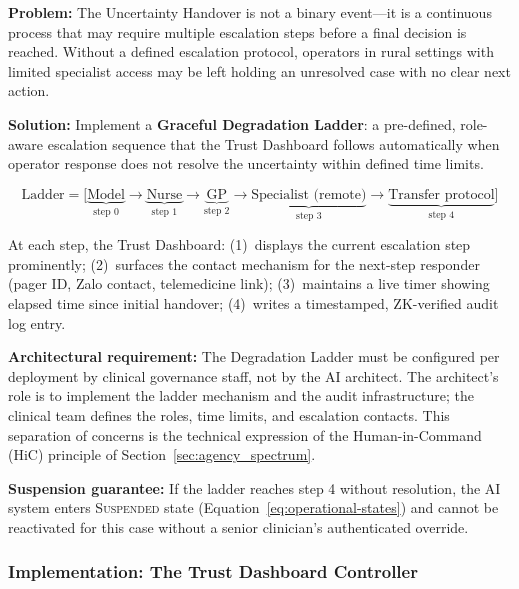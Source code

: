 \begin{tcolorbox}[patternbox,
  title={Design Pattern 5 --- The Graceful Degradation Ladder}]
\textbf{Problem:} The Uncertainty Handover is not a binary
event---it is a continuous process that may require multiple
escalation steps before a final decision is reached.
Without a defined escalation protocol, operators in rural
settings with limited specialist access may be left holding an
unresolved case with no clear next action.

\textbf{Solution:} Implement a \textbf{Graceful Degradation
Ladder}: a pre-defined, role-aware escalation sequence that the
Trust Dashboard follows automatically when operator response
does not resolve the uncertainty within defined time limits.

\begin{equation}
  \label{eq:degradation-ladder}
  \mathrm{Ladder} =
  \bigl[
    \underbrace{\text{Model}}_{\text{step 0}}
    \to
    \underbrace{\text{Nurse}}_{\text{step 1}}
    \to
    \underbrace{\text{GP}}_{\text{step 2}}
    \to
    \underbrace{\text{Specialist (remote)}}_{\text{step 3}}
    \to
    \underbrace{\text{Transfer protocol}}_{\text{step 4}}
  \bigr]
\end{equation}

At each step, the Trust Dashboard:
(1)~displays the current escalation step prominently;
(2)~surfaces the contact mechanism for the next-step
responder (pager ID, Zalo contact, telemedicine link);
(3)~maintains a live timer showing elapsed time since
initial handover;
(4)~writes a timestamped, ZK-verified audit log entry.

\textbf{Architectural requirement:} The Degradation Ladder must
be configured per deployment by clinical governance staff,
not by the AI architect.
The architect's role is to implement the ladder mechanism and
the audit infrastructure; the clinical team defines the roles,
time limits, and escalation contacts.
This separation of concerns is the technical expression of
the Human-in-Command (HiC) principle of
Section~\ref{sec:agency_spectrum}.

\textbf{Suspension guarantee:} If the ladder reaches step 4
without resolution, the AI system enters
\textsc{Suspended} state (Equation~\eqref{eq:operational-states})
and cannot be reactivated for this case without a senior
clinician's authenticated override.
\end{tcolorbox}

\subsubsection{Implementation: The Trust Dashboard Controller}
\label{subsubsec:dashboard-implementation}

